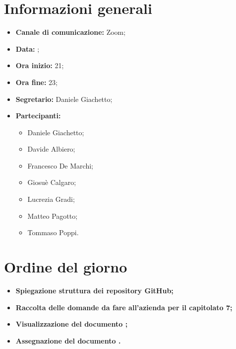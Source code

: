 \section{Informazioni generali}

\begin{itemize}

	\item \textbf{Canale di comunicazione:} Zoom;
	
	\item \textbf{Data:} \DataMeeting{};
	
	\item \textbf{Ora inizio:} 21;
	
	\item \textbf{Ora fine:} 23;
	
	\item \textbf{Segretario:} Daniele Giachetto;
	
	\item \textbf{Partecipanti:}
	
		\begin{itemize}
		
			\item Daniele Giachetto;
			\item Davide Albiero;
			\item Francesco De Marchi;
			\item Giosuè Calgaro;
			\item Lucrezia Gradi;
			\item Matteo Pagotto;
			\item Tommaso Poppi.
				 
		\end{itemize}

\end{itemize}

\section{Ordine del giorno}

\begin{itemize}

	\item\textbf{Spiegazione struttura dei repository GitHub;}

	\item\textbf{Raccolta delle domande da fare all'azienda per il capitolato 7;}

	\item\textbf{Visualizzazione del documento \SdF{};}
	
	\item\textbf{Assegnazione del documento \PdP{}.}

\end{itemize}

